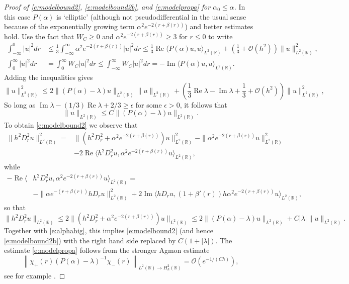 \documentclass[reqno, 12pt]{amsart}
\newcommand \R {\mathbb{R}}
\newcommand \Oh {\mathcal{O}}
\DeclareMathOperator \re {Re}
\DeclareMathOperator \im {Im}
\theoremstyle{definition}
\numberwithin{equation}{section}
\numberwithin{prop}{section}
\numberwithin{figure}{section}
\begin{document}
\begin{proof}[Proof of \eqref{e:modelbound2}, \eqref{e:modelbound2b}, and \eqref{e:modelpropa} for $\alpha_0 \le \alpha$] In this case $P(\alpha)$ is `elliptic' (although not pseudodifferential in the usual sense because of the exponentially growing term $\alpha^2 e^{-2(r+\beta(r))}$) and  better estimates hold.
Use the fact that $W_C \ge 0$  and $\alpha^2 e^{-2(r+\beta(r))} \ge 3$ for $r \le 0$ to write
\begin{align*}
\int_{-\infty}^0 |u|^2 dr &\le \frac 13 \int_{-\infty}^\infty \alpha^2 e^{-2(r+\beta(r))} |u|^2 dr \le \frac 13 \re \langle P(\alpha)u,u\rangle_{L^2(\R)} + \left(\frac 13 + \Oh(h^2)\right) \|u\|_{L^2(\R)}^2, \\
\int_0^\infty |u|^2dr &= \int_0^\infty W_C |u|^2dr \le \int_{-\infty}^\infty W_C|u|^2 dr = -\im \langle P(\alpha) u,u\rangle_{L^2(\R)}.
\end{align*}
Adding the inequalities gives
\[
\|u\|^2_{L^2(\R)} \le 2 \|(P(\alpha) - \lambda)u\|_{L^2(\R)}  \|u\|_{L^2(\R)} +\left(\frac 13\re \lambda - \im \lambda+ \frac 13 + \Oh(h^2)\right)\|u\|^2_{L^2(\R)}, 
\]
So long as $\im \lambda - (1/3) \re \lambda + 2/3 \ge \epsilon$ for some $\epsilon>0$, it follows that
\begin{equation}\label{e:alphabig}
\|u\|_{L^2(\R)} \le C\|(P(\alpha) - \lambda)u\|_{L^2(\R)}.
\end{equation}
To obtain \eqref{e:modelbound2} we observe that
\[\begin{split}
\|h^2D_r^2u\|_{L^2(\R)}^2= &\|(h^2D_r^2 + \alpha^2e^{-2(r+\beta(r))}) u\|_{L^2(\R)}^2 - \|  \alpha^2e^{-2(r+\beta(r))}u\|_{L^2(\R)}^2 \\&- 2 \re \langle h^2 D_r^2 u,  \alpha^2e^{-2(r+\beta(r))} u\rangle_{L^2(\R)},
\end{split}\]
while 
\[\begin{split}
- \re \langle & h^2 D_r^2 u,  \alpha^2e^{-2(r+\beta(r))}  u\rangle_{L^2(\R)} = \\& - \|\alpha e^{-(r+\beta(r))}hD_ru\|_{L^2(\R)}^2 +2 \im \langle h D_r u,  (1+\beta'(r))h\alpha^2e^{-2(r+\beta(r))} u\rangle_{L^2(\R)},
\end{split}\]
so that
\[
\|h^2D_r^2u\|_{L^2(\R)} \le 2 \|(h^2D_r^2 + \alpha^2e^{-2(r+\beta(r))}) u\|_{L^2(\R)} \le 2\|(P(\alpha) - \lambda)u\|_{L^2(\R)} + C |\lambda| \|u\|_{L^2(\R)}. 
\]
Together with \eqref{e:alphabig}, this implies \eqref{e:modelbound2} (and hence \eqref{e:modelbound2b}) with the right hand side replaced by $C(1+|\lambda|)$. The estimate \eqref{e:modelpropa} follows from the stronger Agmon estimate
\[
\left\|\chi_+(r)(P(\alpha) - \lambda)^{-1}\chi_-(r)\right\|_{L^2(\R) \to H^2_h(\R)} = \Oh(e^{-1/(Ch)}),
\]
see for example \cite[Theorems 7.3 and 7.1]{ez}.
\end{proof}
\end{document}
